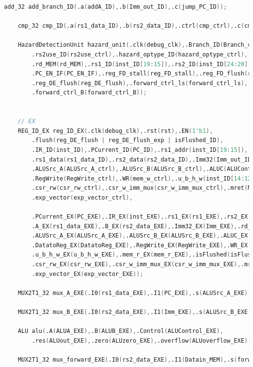 \begin{lstlisting}[language = {verilog}]
    add_32 add_branch_ID(.a(addA_ID),.b(Imm_out_ID),.c(jump_PC_ID));

    cmp_32 cmp_ID(.a(rs1_data_ID),.b(rs2_data_ID),.ctrl(cmp_ctrl),.c(cmp_res_ID));
    
    HazardDetectionUnit hazard_unit(.clk(debug_clk),.Branch_ID(Branch_ctrl),.rs1use_ID(rs1use_ctrl),
        .rs2use_ID(rs2use_ctrl),.hazard_optype_ID(hazard_optype_ctrl),.rd_EXE(rd_EXE),
        .rd_MEM(rd_MEM),.rs1_ID(inst_ID[19:15]),.rs2_ID(inst_ID[24:20]),.rs2_EXE(rs2_EXE),
        .PC_EN_IF(PC_EN_IF),.reg_FD_stall(reg_FD_stall),.reg_FD_flush(reg_FD_flush),
        .reg_DE_flush(reg_DE_flush),.forward_ctrl_ls(forward_ctrl_ls),.forward_ctrl_A(forward_ctrl_A),
        .forward_ctrl_B(forward_ctrl_B));


    // EX
    REG_ID_EX reg_ID_EX(.clk(debug_clk),.rst(rst),.EN(1'b1),
        .flush(reg_DE_flush | reg_DE_flush_exp | isFlushed_ID),
        .IR_ID(inst_ID),.PCurrent_ID(PC_ID),.rs1_addr(inst_ID[19:15]),.rs2_addr(inst_ID[24:20]),
        .rs1_data(rs1_data_ID),.rs2_data(rs2_data_ID),.Imm32(Imm_out_ID),.rd_addr(inst_ID[11:7]),
        .ALUSrc_A(ALUSrc_A_ctrl),.ALUSrc_B(ALUSrc_B_ctrl),.ALUC(ALUControl_ctrl),.DatatoReg(DatatoReg_ctrl),
        .RegWrite(RegWrite_ctrl),.WR(mem_w_ctrl),.u_b_h_w(inst_ID[14:12]),.mem_r(mem_r_ctrl),
        .csr_rw(csr_rw_ctrl),.csr_w_imm_mux(csr_w_imm_mux_ctrl),.mret(MRET),
        .exp_vector(exp_vector_ctrl),

        .PCurrent_EX(PC_EXE),.IR_EX(inst_EXE),.rs1_EX(rs1_EXE),.rs2_EX(rs2_EXE),
        .A_EX(rs1_data_EXE),.B_EX(rs2_data_EXE),.Imm32_EX(Imm_EXE),.rd_EX(rd_EXE),
        .ALUSrc_A_EX(ALUSrc_A_EXE),.ALUSrc_B_EX(ALUSrc_B_EXE),.ALUC_EX(ALUControl_EXE),
        .DatatoReg_EX(DatatoReg_EXE),.RegWrite_EX(RegWrite_EXE),.WR_EX(mem_w_EXE),
        .u_b_h_w_EX(u_b_h_w_EXE),.mem_r_EX(mem_r_EXE),.isFlushed(isFlushed_EXE),
        .csr_rw_EX(csr_rw_EXE),.csr_w_imm_mux_EX(csr_w_imm_mux_EXE),.mret_EX(mret_EXE),
        .exp_vector_EX(exp_vector_EXE));
    
    MUX2T1_32 mux_A_EXE(.I0(rs1_data_EXE),.I1(PC_EXE),.s(ALUSrc_A_EXE),.o(ALUA_EXE));

    MUX2T1_32 mux_B_EXE(.I0(rs2_data_EXE),.I1(Imm_EXE),.s(ALUSrc_B_EXE),.o(ALUB_EXE));

    ALU alu(.A(ALUA_EXE),.B(ALUB_EXE),.Control(ALUControl_EXE),
        .res(ALUout_EXE),.zero(ALUzero_EXE),.overflow(ALUoverflow_EXE));
    
    MUX2T1_32 mux_forward_EXE(.I0(rs2_data_EXE),.I1(Datain_MEM),.s(forward_ctrl_ls),.o(Dataout_EXE));



\end{lstlisting}
